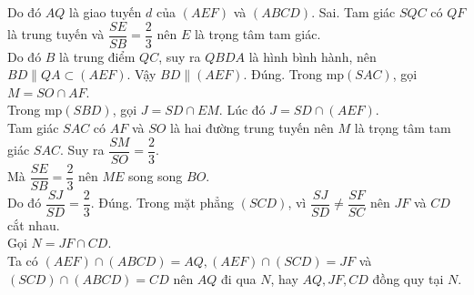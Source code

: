 \begin{ex}
{\begin{itemchoice}
			Do đó $AQ$ là giao tuyến $d$ của $(AEF)$ và $(ABCD)$.
			\itemch Sai. Tam giác $SQC$ có $QF$ là trung tuyến và $\dfrac{SE}{SB}=\dfrac{2}{3}$ nên $E$ là trọng tâm tam giác. \\
			Do đó $B$ là trung điểm $QC$, suy ra $QBDA$ là hình bình hành, nên $BD\parallel QA\subset (AEF)$. Vậy $BD\parallel (AEF)$.
			\itemch Đúng. Trong mp$(SAC)$, gọi $M=SO\cap AF$.\\
			Trong mp$(SBD)$, gọi $J=SD\cap EM$. Lúc đó $J=SD\cap (AEF)$. \\
			Tam giác $SAC$ có $AF$ và $SO$ là hai đường trung tuyến nên $M$ là trọng tâm tam giác $SAC$. Suy ra $\dfrac{SM}{SO}=\dfrac{2}{3}$.\\
			Mà $\dfrac{SE}{SB}=\dfrac{2}{3}$ nên $ME$ song song $BO$.\\
			Do đó $\dfrac{SJ}{SD}=\dfrac{2}{3}$.
			\itemch Đúng.  Trong mặt phẳng $(SCD)$, vì $\dfrac{SJ}{SD}\neq \dfrac{SF}{SC}$ nên $JF$ và $CD$ cắt nhau.\\
			Gọi $N=JF\cap CD$.\\
			Ta có $(AEF)\cap (ABCD)=AQ, (AEF)\cap (SCD)=JF$ và $(SCD) \cap (ABCD)=CD$ nên $AQ$ đi qua $N$, hay $AQ, JF, CD$ đồng quy tại $N$.
		\end{itemchoice}
	}
\end{ex}

